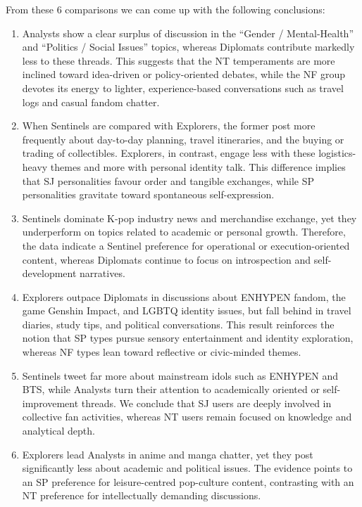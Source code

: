 \documentclass[12pt]{article}
\begin{document}
	From these 6 comparisons we can come up with the following conclusions:
	\begin{enumerate}
	\item Analysts show a clear surplus of discussion in the “Gender / Mental-Health” and “Politics / Social Issues” topics, whereas Diplomats contribute markedly less to these threads. This suggests that the NT temperaments are more inclined toward idea-driven or policy-oriented debates, while the NF group devotes its energy to lighter, experience-based conversations such as travel logs and casual fandom chatter.
	\item When Sentinels are compared with Explorers, the former post more frequently about day-to-day planning, travel itineraries, and the buying or trading of collectibles. Explorers, in contrast, engage less with these logistics-heavy themes and more with personal identity talk. This difference implies that SJ personalities favour order and tangible exchanges, while SP personalities gravitate toward spontaneous self-expression.
	\item Sentinels dominate K-pop industry news and merchandise exchange, yet they underperform on topics related to academic or personal growth. Therefore, the data indicate a Sentinel preference for operational or execution-oriented content, whereas Diplomats continue to focus on introspection and self-development narratives.
	\item Explorers outpace Diplomats in discussions about ENHYPEN fandom, the game Genshin Impact, and LGBTQ identity issues, but fall behind in travel diaries, study tips, and political conversations. This result reinforces the notion that SP types pursue sensory entertainment and identity exploration, whereas NF types lean toward reflective or civic-minded themes.
	\item Sentinels tweet far more about mainstream idols such as ENHYPEN and BTS, while Analysts turn their attention to academically oriented or self-improvement threads. We conclude that SJ users are deeply involved in collective fan activities, whereas NT users remain focused on knowledge and analytical depth.
	\item Explorers lead Analysts in anime and manga chatter, yet they post significantly less about academic and political issues. The evidence points to an SP preference for leisure-centred pop-culture content, contrasting with an NT preference for intellectually demanding discussions.
	\end{enumerate}
	
\end{document}
